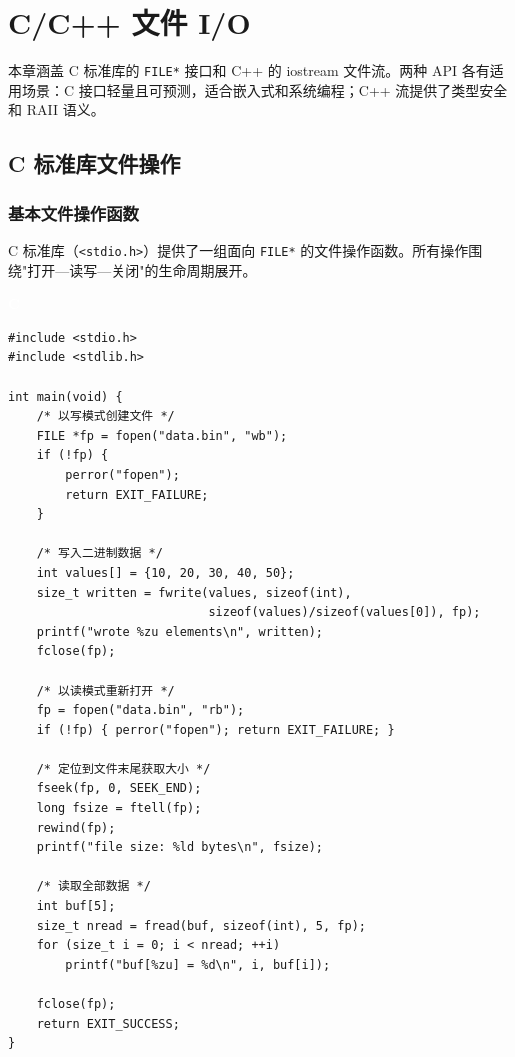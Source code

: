 \documentclass[12pt,a4paper,fontset=fandol]{ctexbook}
\newcommand{\Tp}[1]{\texttt{#1}}
\newcommand{\clabel}{%
  \noindent\begin{tcolorbox}[sharp corners,colback=fileheadbg,colframe=fileheadbg,
    left=6pt,right=6pt,top=2pt,bottom=2pt,boxrule=0pt]
  \textcolor{white}{\small\bfseries\sffamily C}\end{tcolorbox}%
}
\begin{document}
\chapter{C/C++ 文件 I/O}

本章涵盖 C 标准库的 \Tp{FILE*} 接口和 C++ 的 iostream 文件流。两种 API 各有适用场景：C 接口轻量且可预测，适合嵌入式和系统编程；C++ 流提供了类型安全和 RAII 语义。

\section{C 标准库文件操作}

\subsection{基本文件操作函数}

C 标准库（\Tp{<stdio.h>}）提供了一组面向 \Tp{FILE*} 的文件操作函数。所有操作围绕"打开—读写—关闭"的生命周期展开。

\clabel
\begin{lstlisting}[style=cstyle]
#include <stdio.h>
#include <stdlib.h>

int main(void) {
    /* 以写模式创建文件 */
    FILE *fp = fopen("data.bin", "wb");
    if (!fp) {
        perror("fopen");
        return EXIT_FAILURE;
    }

    /* 写入二进制数据 */
    int values[] = {10, 20, 30, 40, 50};
    size_t written = fwrite(values, sizeof(int),
                            sizeof(values)/sizeof(values[0]), fp);
    printf("wrote %zu elements\n", written);
    fclose(fp);

    /* 以读模式重新打开 */
    fp = fopen("data.bin", "rb");
    if (!fp) { perror("fopen"); return EXIT_FAILURE; }

    /* 定位到文件末尾获取大小 */
    fseek(fp, 0, SEEK_END);
    long fsize = ftell(fp);
    rewind(fp);
    printf("file size: %ld bytes\n", fsize);

    /* 读取全部数据 */
    int buf[5];
    size_t nread = fread(buf, sizeof(int), 5, fp);
    for (size_t i = 0; i < nread; ++i)
        printf("buf[%zu] = %d\n", i, buf[i]);

    fclose(fp);
    return EXIT_SUCCESS;
}
\end{lstlisting}
\end{document}
